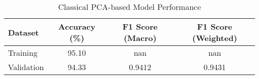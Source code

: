 
\begin{table}[h]
\centering
\caption{Classical PCA-based Model Performance}
\begin{tabular}{lccc}
\hline
\textbf{Dataset} & \textbf{Accuracy (\%)} & \textbf{F1 Score (Macro)} & \textbf{F1 Score (Weighted)} \\
\hline
Training & 95.10 & nan & nan \\
Validation & 94.33 & 0.9412 & 0.9431 \\
\hline
\end{tabular}
\end{table}
